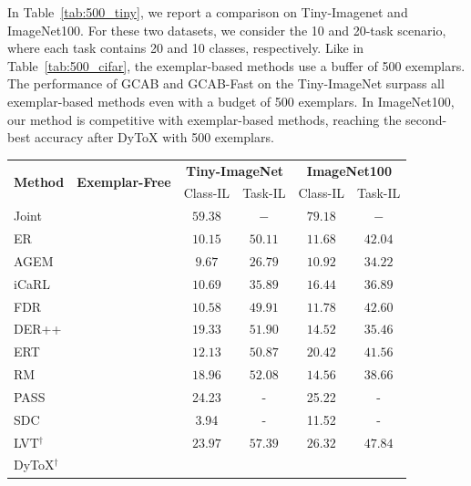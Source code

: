 \documentclass[twocolumn]{svjour3}          %
\newcommand{\cmark}{\ding{51}}%
\newcommand{\xmark}{\ding{55}}%
\begin{document}
In Table~\ref{tab:500_tiny}, we report a comparison on Tiny-Imagenet and ImageNet100. For these two datasets, we consider the 10 and 20-task scenario, where each task contains 20 and 10 classes, respectively. Like in Table~\ref{tab:500_cifar}, the exemplar-based methods use a buffer of 500 exemplars. The performance of GCAB and GCAB-Fast on the Tiny-ImageNet surpass all exemplar-based methods even with a budget of 500 exemplars. In ImageNet100, our method is competitive with exemplar-based methods, reaching the second-best accuracy after DyToX with 500 exemplars.

\begin{table}[tb]
\centering
  \begin{tabular}{lccccc}
    \hline
    \multirow{2}{*}{\textbf{Method}} 
    &\multirow{2}{*}{\textbf{Exemplar-Free}}
    &\multicolumn{2}{c}{\textbf{Tiny-ImageNet}}
    &\multicolumn{2}{c}{\textbf{ImageNet100}}\\ 
    & &Class-IL &Task-IL&Class-IL &Task-IL \\
    \hline
    Joint& \cmark& $59.38$ & $-$ & $79.18$ & $-$\\
    \hline
    ER \hfill \citep{riemer2018learning}  & \xmark
    &$10.15$  &$50.11$& $11.68$ & $42.04$
     \\
    AGEM \hfill \citep{chaudhry2018efficient} & \xmark 
    &$9.67$  &$26.79$&$10.92$ & $34.22$ 
     \\
    iCaRL \hfill \citep{rebuffi2017icarl} & \xmark
    &$10.69$  &$35.89$& $16.44$ & $36.89$ 
     \\
    FDR \hfill \citep{benjamin2018measuring}  & \xmark 
    &$10.58$  &$49.91$& $11.78$ & $42.60$ 
     \\
    DER++ \hfill \citep{buzzega2020dark} & \xmark 
    &$19.33$ &$51.90$& $14.52$ & $35.46$ 
     \\
    ERT \hfill \citep{buzzega2021rethinking}  & \xmark 
    &$12.13$ &$50.87$& $20.42$ & $41.56$ 
     \\
    RM \hfill \citep{bang2021rainbow}   &\xmark 
    &$18.96$ &$52.08$& $14.56$ & $38.66$ 
     \\
    PASS \hfill \citep{zhu2021prototype}
     & \cmark & 24.23&- &25.22&-\\
    SDC \hfill \citep{yu2020semantic}
     & \cmark&3.94 & -&11.52 &-\\
    \hline
    LVT$^{\dag}$ \hfill \citep{wang2022continual} &\xmark 
    &$23.97$ &$57.39$& $26.32$ & $47.84$ 
     \\
    DyToX$^{\dag}$ \hfill \citep{douillard2022dytox} &\xmark 

\end{tabular}
\end{table}
\end{document}
